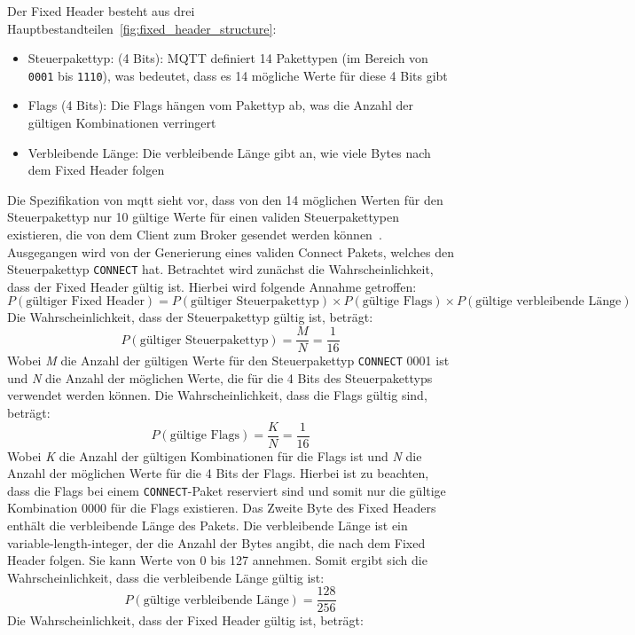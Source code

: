 Der Fixed Header besteht aus drei Hauptbestandteilen~\ref{fig:fixed_header_structure}:
\begin{itemize}
    \item Steuerpakettyp: (4 Bits): MQTT definiert 14 Pakettypen (im Bereich von \texttt{0001} bis \texttt{1110}), was
    bedeutet, dass es 14 mögliche Werte für diese 4 Bits gibt
    \item Flags (4 Bits): Die Flags hängen vom Pakettyp ab, was die Anzahl der gültigen Kombinationen verringert
    \item Verbleibende Länge: Die verbleibende Länge gibt an, wie viele Bytes nach dem Fixed Header folgen
\end{itemize}
Die Spezifikation von \gls{mqtt} sieht vor, dass von den 14 möglichen Werten für den Steuerpakettyp nur 10 gültige Werte
für einen validen Steuerpakettypen existieren, die von dem Client zum Broker gesendet werden können~\cite{mqtt-fixed-header}.
Ausgegangen wird von der Generierung eines validen Connect Pakets, welches den Steuerpakettyp \texttt{CONNECT} hat.
Betrachtet wird zunächst die Wahrscheinlichkeit, dass der Fixed Header gültig ist.
Hierbei wird folgende Annahme getroffen:
\[
    P(\text{gültiger Fixed Header}) = P(\text{gültiger Steuerpakettyp}) \times P(\text{gültige Flags}) \times P(\text{gültige verbleibende Länge})
\]
Die Wahrscheinlichkeit, dass der Steuerpakettyp gültig ist, beträgt:
\[
    P(\text{gültiger Steuerpakettyp}) = \frac{M}{N} = \frac{1}{16}
\]
Wobei \textit{M} die Anzahl der gültigen Werte für den Steuerpakettyp \texttt{CONNECT} 0001 ist und \textit{N} die Anzahl der möglichen Werte, die
für die 4 Bits des Steuerpakettyps verwendet werden können.
Die Wahrscheinlichkeit, dass die Flags gültig sind, beträgt:
\[
    P(\text{gültige Flags}) = \frac{K}{N} = \frac{1}{16}
\]
Wobei \textit{K} die Anzahl der gültigen Kombinationen für die Flags ist und \textit{N} die Anzahl der möglichen Werte für die 4 Bits der Flags.
Hierbei ist zu beachten, dass die Flags bei einem \texttt{CONNECT}-Paket reserviert sind und somit nur die gültige Kombination
0000 für die Flags existieren.\newline
Das Zweite Byte des Fixed Headers enthält die verbleibende Länge des Pakets.
Die verbleibende Länge ist ein variable-length-integer, der die Anzahl der Bytes angibt, die nach dem Fixed Header folgen.
Sie kann Werte von 0 bis 127 annehmen.
Somit ergibt sich die Wahrscheinlichkeit, dass die verbleibende Länge gültig ist:
\[
    P(\text{gültige verbleibende Länge}) = \frac{128}{256}
\]
Die Wahrscheinlichkeit, dass der Fixed Header gültig ist, beträgt:
